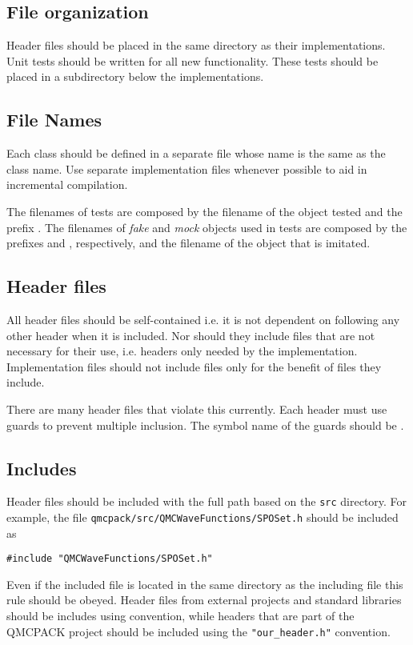 \subsection{File organization}
Header files should be placed in the same directory as their implementations. 
Unit tests should be written for all new functionality. These tests should be placed in a  subdirectory below the implementations.

\subsection{File Names}
Each class should be defined in a separate file whose name is the same as the class name. Use separate  implementation files whenever possible to aid in incremental compilation. 

The filenames of tests are composed by the filename of the object tested and the prefix .
The filenames of \emph{fake} and \emph{mock} objects used in tests are composed by the prefixes  and , respectively, and the filename of the object that is imitated.

\subsection{Header files}
All header files should be self-contained i.e. it is not dependent on following any other header when it is included. Nor should they include files that are not necessary for their use, i.e. headers only needed by the implementation. Implementation files should not include files only for the benefit of files they include.

There are many header files that violate this currently.
Each header must use  guards to prevent multiple inclusion.
The symbol name of the  guards should be .

\subsection{Includes}
Header files should be included with the full path based on the \verb|src| directory.
For example, the file \verb|qmcpack/src/QMCWaveFunctions/SPOSet.h| should be included as
\begin{lstlisting}
#include "QMCWaveFunctions/SPOSet.h"
\end{lstlisting}
Even if the included file is located in the same directory as the including file this rule should be obeyed. Header files from external projects and standard libraries should be includes using  convention, while headers that are part of the QMCPACK project should be included using the \verb|"our_header.h"| convention.

